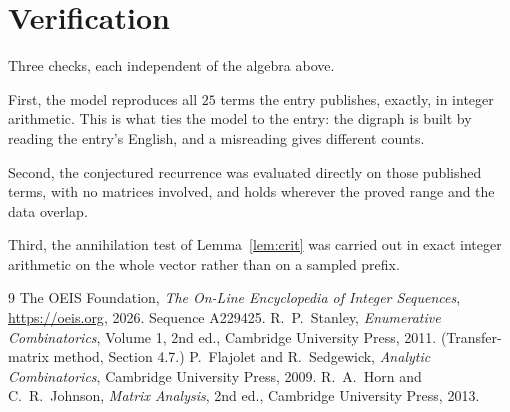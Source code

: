 \documentclass[11pt,a4paper]{article}
\theoremstyle{plain}
\theoremstyle{definition}
\begin{document}
\section{Verification}

Three checks, each independent of the algebra above.

First, the model reproduces all $25$ terms the entry publishes, exactly, in integer
arithmetic. This is what ties the model to the entry: the digraph is built by reading the
entry's English, and a misreading gives different counts.

Second, the conjectured recurrence was evaluated directly on those published terms, with no
matrices involved, and holds wherever the proved range and the data overlap.

Third, the annihilation test of Lemma~\ref{lem:crit} was carried out in exact integer
arithmetic on the whole vector rather than on a sampled prefix.

\begin{thebibliography}{9}
 The OEIS Foundation, \emph{The On-Line Encyclopedia of Integer
Sequences}, \url{https://oeis.org}, 2026. Sequence A229425.
 R.~P.~Stanley, \emph{Enumerative Combinatorics}, Volume 1, 2nd ed.,
Cambridge University Press, 2011. (Transfer-matrix method, Section 4.7.)
 P.~Flajolet and R.~Sedgewick, \emph{Analytic Combinatorics}, Cambridge
University Press, 2009.
 R.~A.~Horn and C.~R.~Johnson, \emph{Matrix Analysis}, 2nd ed., Cambridge
University Press, 2013.
\end{thebibliography}
\end{document}
